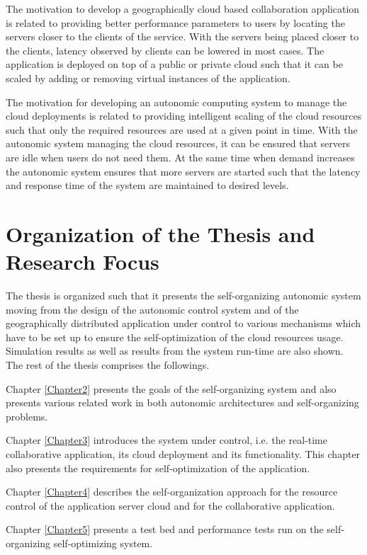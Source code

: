 The motivation to develop a geographically cloud based collaboration application is related to providing better performance parameters to users by locating the servers closer to the clients of the service. With the servers being placed closer to the clients, latency observed by clients can be lowered in most cases. The application is deployed on top of a public or private cloud such that it can be scaled by adding or removing virtual instances of the application. 

The motivation for developing an autonomic computing system to manage the cloud deployments is related to providing intelligent scaling of the cloud resources such that only the required resources are used at a given point in time. With the autonomic system managing the cloud resources, it can be ensured that servers are idle when users do not need them. At the same time when demand increases the autonomic system ensures that more servers are started such that the latency and response time of the system are maintained to desired levels.

\section{Organization of the Thesis and Research Focus}

The thesis is organized such that it presents the self-organizing autonomic system moving from the design of the autonomic control system and of the geographically distributed application under control to various mechanisms which have to be set up to ensure the self-optimization of the cloud resources usage. Simulation results as well as results from the system run-time are also shown. The rest of the thesis  comprises the followings.

Chapter \ref{Chapter2} presents the goals of the self-organizing system and also presents various related work in both autonomic architectures and self-organizing problems.

Chapter \ref{Chapter3} introduces the system under control, i.e. the real-time collaborative application, its cloud deployment and its functionality. This chapter also presents the requirements for self-optimization of the application.

Chapter \ref{Chapter4} describes the self-organization approach for the resource control of the application server cloud and for the collaborative application.

Chapter \ref{Chapter5} presents a test bed and performance tests run on the self-organizing self-optimizing system.

